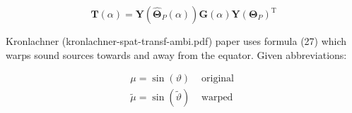 \begin{equation}
\boldsymbol{T}(\alpha)=\boldsymbol{Y}\left(\hat{\boldsymbol{\Theta}}_{P}(\alpha)\right) \boldsymbol{G}(\alpha) \boldsymbol{Y}\left(\boldsymbol{\Theta}_{P}\right)^{\mathrm{T}}
\label{eq:hoast-zoom}
\end{equation}



Kronlachner (kronlachner-spat-transf-ambi.pdf) paper uses formula (27) which warps sound sources towards and away from the equator. Given abbreviations:

\begin{equation}
\begin{array}{ll}
\mu=\sin (\vartheta) & \text { original } \\
\tilde{\mu}=\sin (\tilde{\vartheta}) & \text { warped}
\end{array}
\end{equation}











